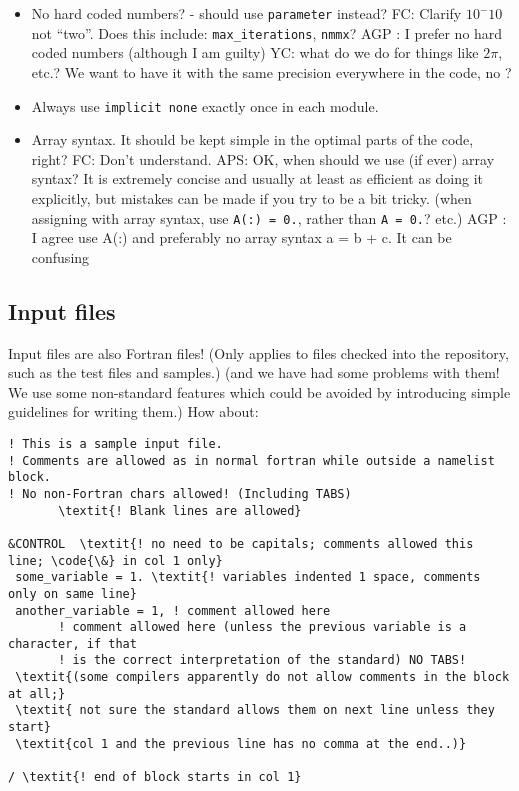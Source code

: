 \documentclass[12pt,twoside,notitlepage,a4paper]{article}
\newcommand{\code}[1]{\texttt{#1}}
\begin{document}
\begin{itemize}
\item No hard coded numbers? - should use \code{parameter} instead?  FC: Clarify $10^-10$ not ``two''.  Does this include: \texttt{max_iterations}, \texttt{nmmx}? AGP : I prefer no hard coded numbers (although I am guilty) YC: what do we do for things like $2\pi$, etc.? We want to have it with the same precision everywhere in the code, no ?
\item Always use \code{implicit none} exactly once in each module. 
\item Array syntax. It should be kept simple in the optimal parts of the code, right? FC: Don't understand. APS: OK, when should we use (if ever) array syntax?
It is extremely concise and usually at least as efficient as doing it explicitly, but mistakes can be made if you try to be a bit tricky.
(when assigning with array syntax, use \code{A(:) = 0.}, rather than \code{A = 0.}? etc.) AGP : I agree use A(:) and preferably no array syntax a = b + c. It can be confusing
\end{itemize}

\subsection{Input files}

Input files are also Fortran files! (Only applies to files checked into the repository, such
as the test files and samples.)
(and we have had some problems with them! We use some non-standard features which could be avoided
by introducing simple guidelines for writing them.)
How about:

\begin{Verbatim}[commandchars=\\\{\}]
! This is a sample input file.
! Comments are allowed as in normal fortran while outside a namelist block.
! No non-Fortran chars allowed! (Including TABS)
       \textit{! Blank lines are allowed}

&CONTROL  \textit{! no need to be capitals; comments allowed this line; \code{\&} in col 1 only}
 some_variable = 1. \textit{! variables indented 1 space, comments only on same line}
 another_variable = 1, ! comment allowed here
       ! comment allowed here (unless the previous variable is a character, if that
	   ! is the correct interpretation of the standard) NO TABS!
 \textit{(some compilers apparently do not allow comments in the block at all;}
 \textit{ not sure the standard allows them on next line unless they start}
 \textit{col 1 and the previous line has no comma at the end..)}

/ \textit{! end of block starts in col 1}
\end{Verbatim}
\end{document}
